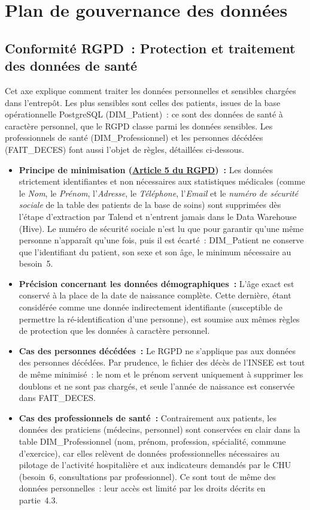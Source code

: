 \newpage
\section{Plan de gouvernance des données}\label{sec:gouvernance}

\subsection{Conformité RGPD~: Protection et traitement des données de santé}

\noindent Cet axe explique comment traiter les données personnelles et sensibles chargées dans l'entrepôt. Les plus sensibles sont celles des patients, issues de la base opérationnelle PostgreSQL (DIM\_Patient)~: ce sont des données de santé à caractère personnel, que le RGPD classe parmi les données sensibles. Les professionnels de santé (DIM\_Professionnel) et les personnes décédées (FAIT\_DECES) font aussi l'objet de règles, détaillées ci-dessous.
\begin{itemize}
	\item \textbf{Principe de minimisation (\href{https://www.cnil.fr/fr/reglement-europeen-protection-donnees/chapitre2\#Article5}{Article 5 du RGPD})~:} Les données strictement identifiantes et non nécessaires aux statistiques médicales (comme le \textit{Nom}, le \textit{Prénom}, l’\textit{Adresse}, le \textit{Téléphone}, l’\textit{Email} et le \textit{numéro de sécurité sociale} de la table des patients de la base de soins) sont supprimées dès l'étape d'extraction par Talend et n'entrent jamais dans le Data Warehouse (Hive). Le numéro de sécurité sociale n'est lu que pour garantir qu'une même personne n'apparaît qu'une fois, puis il est écarté~: DIM\_Patient ne conserve que l'identifiant du patient, son sexe et son âge, le minimum nécessaire au besoin~5.
	\item \textbf{Précision concernant les données démographiques~:} L'âge exact est conservé à la place de la date de naissance complète. Cette dernière, étant considérée comme une donnée indirectement identifiante (susceptible de permettre la ré-identification d'une personne), est soumise aux mêmes règles de protection que les données à caractère personnel.
	\item \textbf{Cas des personnes décédées~:} Le RGPD ne s'applique pas aux données des personnes décédées. Par prudence, le fichier des décès de l'INSEE est tout de même minimisé~: le nom et le prénom servent uniquement à supprimer les doublons et ne sont pas chargés, et seule l'année de naissance est conservée dans FAIT\_DECES.
	\item \textbf{Cas des professionnels de santé~:} Contrairement aux patients, les données des praticiens (médecins, personnel) sont conservées en clair dans la table DIM\_Professionnel (nom, prénom, profession, spécialité, commune d'exercice), car elles relèvent de données professionnelles nécessaires au pilotage de l'activité hospitalière et aux indicateurs demandés par le CHU (besoin~6, consultations par professionnel). Ce sont tout de même des données personnelles~: leur accès est limité par les droits décrits en partie~4.3.
\end{itemize}

